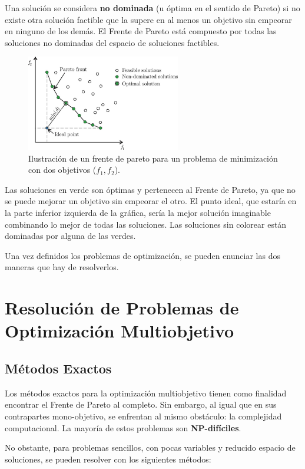 \documentclass[12pt,a4paper]{book}
\begin{document}
Una solución se considera \textbf{no dominada} (u óptima en el sentido de Pareto) si no existe otra solución factible que la supere en al menos un objetivo sin empeorar en ninguno de los demás. El Frente de Pareto está compuesto por todas las soluciones no dominadas del espacio de soluciones factibles.
\begin{figure}[H]
    \centering
    \includegraphics[width=0.6\textwidth]{images/pareto_front.png}
    \caption{\citep{Bre2017} Ilustración de un frente de pareto para un problema de minimización con dos objetivos ($f_1, f_2$).}
    \label{fig:pareto}
\end{figure}
Las soluciones en verde son óptimas y pertenecen al Frente de Pareto, ya que no se puede mejorar un objetivo sin empeorar el otro. El punto ideal, que estaría en la parte inferior izquierda de la gráfica, sería la mejor solución imaginable combinando lo mejor de todas las soluciones. Las soluciones sin colorear están dominadas por alguna de las verdes.

Una vez definidos los problemas de optimización, se pueden enunciar las dos maneras que hay de resolverlos.

\section{Resolución de Problemas de Optimización Multiobjetivo}

\subsection{Métodos Exactos}

Los métodos exactos para la optimización multiobjetivo tienen como finalidad encontrar el Frente de Pareto al completo. Sin embargo, al igual que en sus contrapartes mono-objetivo, se enfrentan al mismo obstáculo: la complejidad computacional. La mayoría de estos problemas son \textbf{NP-difíciles}.

No obstante, para problemas sencillos, con pocas variables y reducido espacio de soluciones, se pueden resolver con los siguientes métodos:
\end{document}
